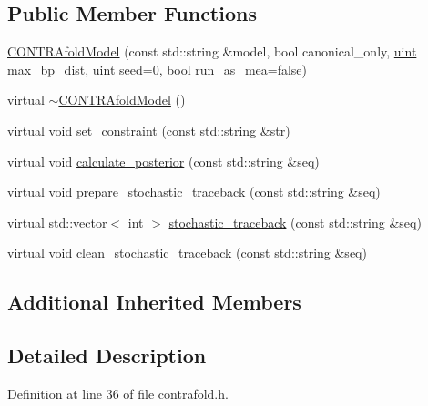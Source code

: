 \subsection*{Public Member Functions}
\begin{DoxyCompactItemize}
\item 
\hyperlink{class_c_o_n_t_r_afold_model_a00838b8ab522f71f5287071104bd6ffd}{C\+O\+N\+T\+R\+Afold\+Model} (const std\+::string \&model, bool canonical\+\_\+only, \hyperlink{cyktable_8h_a91ad9478d81a7aaf2593e8d9c3d06a14}{uint} max\+\_\+bp\+\_\+dist, \hyperlink{cyktable_8h_a91ad9478d81a7aaf2593e8d9c3d06a14}{uint} seed=0, bool run\+\_\+as\+\_\+mea=\hyperlink{naview_8c_a65e9886d74aaee76545e83dd09011727}{false})
\item 
virtual \hyperlink{class_c_o_n_t_r_afold_model_adfc8268ab44289421a36e3327f5f6434}{$\sim$\+C\+O\+N\+T\+R\+Afold\+Model} ()
\item 
virtual void \hyperlink{class_c_o_n_t_r_afold_model_aa1d31567da78c2c621d62675a8f326ae}{set\+\_\+constraint} (const std\+::string \&str)
\item 
virtual void \hyperlink{class_c_o_n_t_r_afold_model_af9b44d34a59607ba105bd1e57b3f5c6f}{calculate\+\_\+posterior} (const std\+::string \&seq)
\item 
virtual void \hyperlink{class_c_o_n_t_r_afold_model_a677989ea8d48f3d3217d1d4fabef034c}{prepare\+\_\+stochastic\+\_\+traceback} (const std\+::string \&seq)
\item 
virtual std\+::vector$<$ int $>$ \hyperlink{class_c_o_n_t_r_afold_model_a759a5951561c3bc350d030fe34e760bb}{stochastic\+\_\+traceback} (const std\+::string \&seq)
\item 
virtual void \hyperlink{class_c_o_n_t_r_afold_model_a0588b069b4c61786217ec9878991130b}{clean\+\_\+stochastic\+\_\+traceback} (const std\+::string \&seq)
\end{DoxyCompactItemize}
\subsection*{Additional Inherited Members}


\subsection{Detailed Description}


Definition at line 36 of file contrafold.\+h.



